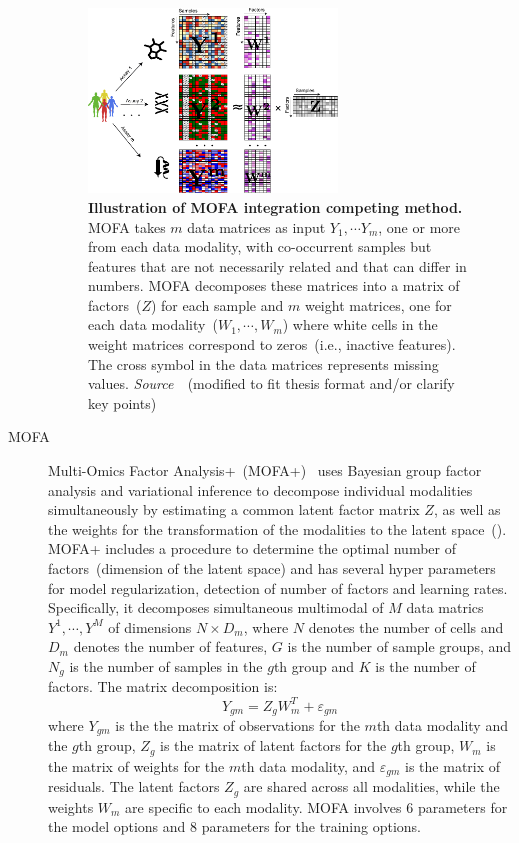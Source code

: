 \begin{description}
\begin{figure}[!h]
  	\centering
  	\includegraphics[width=0.65\textwidth]{Alg_MOFA/fig}
  	\vspace{0.1cm}
  	\caption[Illustration of MOFA integration competing method.]{\textbf{Illustration of MOFA integration competing method.} MOFA takes $m$ data matrices as input $Y_1, \cdots Y_m$, one or more from each data modality, with co-occurrent samples but features that are not necessarily related and that can differ in numbers. MOFA decomposes these matrices into a matrix of factors~($Z$) for each sample and $m$ weight matrices, one for each data modality~($W_1,\cdots, W_m$) where white cells in the weight matrices correspond to zeros~(i.e., inactive features). The cross symbol in the data matrices represents missing values. \emph{Source~\cite{tewari2017mofa}}~(modified to fit thesis format and/or clarify key points)
  }
  	\label{fig:Alg_MOFA}
\end{figure}
 
  \item[MOFA]
  Multi-Omics Factor Analysis+~(MOFA+)~\citep{argelaguet2020mofa+} uses Bayesian group factor analysis and variational inference to decompose individual modalities simultaneously by estimating a common latent factor matrix $Z$, as well as the weights for the transformation of the modalities to the latent space~(). MOFA+ includes a procedure to determine the optimal number of factors~(dimension of the latent space) and has several hyper parameters for model regularization, detection of number of factors and learning rates. Specifically, it decomposes simultaneous multimodal of $M$ data matrics $Y^1, \cdots, Y^M$ of dimensions $N\times D_m$, where $N$ denotes the number of cells and $D_m$ denotes the number of features, $G$ is the number of sample groups, and $N_g$ is the number of samples in the $g$th group and $K$ is the number of factors. The matrix decomposition is:
  \begin{equation}
  Y_{gm} = Z_gW_m^{T} + \varepsilon_{gm}
  \end{equation}
  where $Y_{gm}$ is the the matrix of observations for the $m$th data modality and the $g$th group, $Z_g$ is the matrix of latent factors for the $g$th group, $W_m$ is the matrix of weights for the $m$th data modality, and $\varepsilon_{gm}$ is the matrix of residuals. The latent factors $Z_g$ are shared across all modalities, while the weights $W_m$ are specific to each modality. MOFA involves 6 parameters for the model options and 8 parameters for the training options. %



\end{description}
